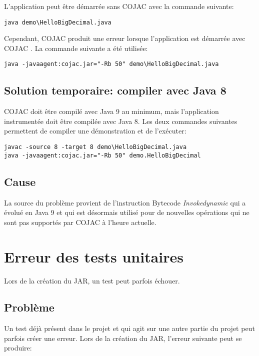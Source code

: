 L'application peut être démarrée sans COJAC \cite{COJAC} avec la commande suivante:
\begin{verbatim}
java demo\HelloBigDecimal.java
\end{verbatim}

Cependant, COJAC \cite{COJAC} produit une erreur lorsque l'application est démarrée avec COJAC \cite{COJAC}. La commande suivante a été utilisée:
\begin{verbatim}
java -javaagent:cojac.jar="-Rb 50" demo\HelloBigDecimal.java
\end{verbatim}

\subsection{Solution temporaire: compiler avec Java 8}

COJAC \cite{COJAC} doit être compilé avec Java 9 au minimum, mais l'application instrumentée doit être compilée avec Java 8. Les deux commandes suivantes permettent de compiler une démonstration et de l'exécuter:
\begin{verbatim}
javac -source 8 -target 8 demo\HelloBigDecimal.java
java -javaagent:cojac.jar="-Rb 50" demo.HelloBigDecimal
\end{verbatim}

\subsection{Cause}

La source du problème provient de l'instruction Bytecode \textit{Invokedynamic} qui a évolué en Java 9 et qui est désormais utilisé pour de nouvelles opérations qui ne sont pas supportés par COJAC \cite{COJAC} à l'heure actuelle.

\section{Erreur des tests unitaires}

Lors de la création du JAR, un test peut parfois échouer.

\subsection{Problème}

Un test déjà présent dans le projet et qui agit sur une autre partie du projet peut parfois créer une erreur. Lors de la création du JAR, l'erreur suivante peut se produire:

